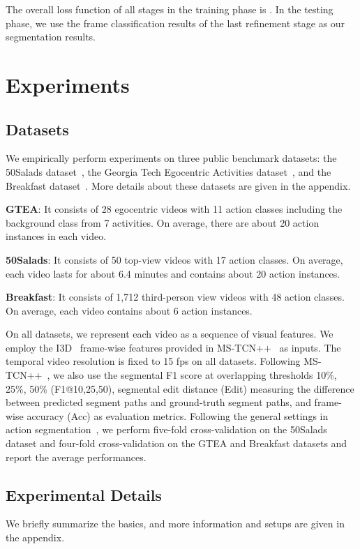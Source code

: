 \documentclass[letterpaper]{article} \usepackage[submission]{aaai23}  \usepackage{times}  \usepackage{helvet}  \usepackage{courier}  \usepackage[hyphens]{url}  \usepackage{graphicx} \urlstyle{rm} \def\UrlFont{\rm}  \usepackage{natbib}  \usepackage{caption} \frenchspacing  \setlength{\pdfpagewidth}{8.5in} \setlength{\pdfpageheight}{11in} \usepackage{algorithm}
\begin{document}
The overall loss function of all stages in the training phase is .
In the testing phase, we use the frame classification results of the last refinement stage as our segmentation results.







\section{Experiments}
\label{sec:exp}
\subsection{Datasets}
We empirically perform experiments on three public benchmark datasets: the 50Salads dataset~\cite{stein2013combining}, the Georgia Tech Egocentric Activities dataset~\cite{fathi2011learning}, and the Breakfast dataset~\cite{kuehne2014language}. More details about these datasets are given in the appendix.

\textbf{GTEA}: It consists of 28 egocentric videos with 11 action classes including the background class from 7 activities. On average, there are about 20 action instances in each video.

\textbf{50Salads}: It consists of 50 top-view videos with 17 action classes. On average, each video lasts for about 6.4 minutes and contains about 20 action instances.

\textbf{Breakfast}: It consists of 1,712 third-person view videos with 48 action classes. On average, each video contains about 6 action instances.

On all datasets, we represent each video as a sequence of visual features. We employ the I3D~\cite{carreira2017quo} frame-wise features provided in MS-TCN++~\cite{li2020ms} as inputs. The temporal video resolution is fixed to 15 fps on all datasets. Following MS-TCN++~\cite{li2020ms}, we also use the segmental F1 score at overlapping thresholds 10\%, 25\%, 50\% (F1@{10,25,50}), segmental edit distance (Edit) measuring the difference between predicted segment paths and ground-truth segment paths, and frame-wise accuracy (Acc) as evaluation metrics. Following the general settings in action segmentation~\cite{farha2019ms,li2020ms}, we perform five-fold cross-validation on the 50Salads dataset and four-fold cross-validation on the GTEA and Breakfast datasets and report the average performances.

\subsection{Experimental Details}
We briefly summarize the basics, and more information and setups are given in the appendix.
\end{document}
